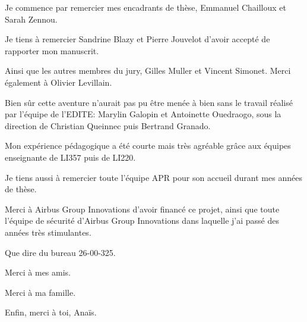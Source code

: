 

Je commence par remercier mes encadrants de thèse, Emmanuel Chailloux et Sarah
Zennou.


Je tiens à remercier Sandrine Blazy et Pierre Jouvelot d'avoir accepté de
rapporter mon manuscrit.


Ainsi que les autres membres du jury, Gilles Muller et Vincent Simonet.
Merci également à Olivier Levillain.


Bien sûr cette aventure n'aurait pas pu être menée à bien sans le travail
réalisé par l'équipe de l'EDITE: Marylin Galopin et Antoinette Ouedraogo, sous
la direction de Christian Queinnec puis Bertrand Granado.


Mon expérience pédagogique a été courte mais très agréable grâce aux équipes
enseignante de LI357 puis de LI220.


Je tiens aussi à remercier toute l'équipe APR pour son accueil durant mes années
de thèse.


Merci à Airbus Group Innovations d'avoir financé ce projet, ainsi que toute
l'équipe de sécurité d'Airbus Group Innovations dans laquelle j'ai passé des
années très stimulantes. 


Que dire du bureau 26-00-325.


Merci à mes amis.


Merci à ma famille.


Enfin, merci à toi, Anaïs.
